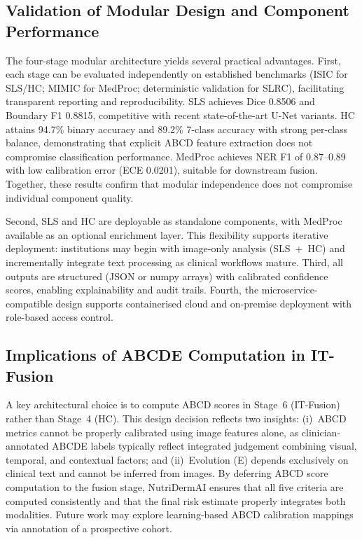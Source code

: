 \documentclass[conference]{IEEEtran}
\begin{document}
\subsection{Validation of Modular Design and Component Performance}

The four-stage modular architecture yields several practical advantages.
First, each stage can be evaluated independently on established
benchmarks (ISIC for SLS/HC; MIMIC for MedProc; deterministic
validation for SLRC), facilitating transparent reporting and
reproducibility. SLS achieves Dice 0.8506 and Boundary F1 0.8815,
competitive with recent state-of-the-art U-Net variants. HC attains
94.7\% binary accuracy and 89.2\% 7-class accuracy with strong
per-class balance, demonstrating that explicit ABCD feature extraction
does not compromise classification performance. MedProc achieves NER F1
of 0.87--0.89 with low calibration error (ECE 0.0201), suitable for
downstream fusion. Together, these results confirm that modular
independence does not compromise individual component quality.

Second, SLS and HC are deployable as standalone components, with MedProc
available as an optional enrichment layer. This flexibility supports
iterative deployment: institutions may begin with image-only analysis
(SLS~+~HC) and incrementally integrate text processing as clinical
workflows mature. Third, all outputs are structured (JSON or numpy
arrays) with calibrated confidence scores, enabling explainability and
audit trails. Fourth, the microservice-compatible design supports
containerised cloud and on-premise deployment with role-based access
control.

\subsection{Implications of ABCDE Computation in IT-Fusion}

A key architectural choice is to compute ABCD scores in Stage~6
(IT-Fusion) rather than Stage~4 (HC). This design decision reflects two
insights: (i)~ABCD metrics cannot be properly calibrated using image
features alone, as clinician-annotated ABCDE labels typically reflect
integrated judgement combining visual, temporal, and contextual factors;
and (ii)~Evolution (E) depends exclusively on clinical text and cannot
be inferred from images. By deferring ABCD score computation to the
fusion stage, NutriDermAI ensures that all five criteria are computed
consistently and that the final risk estimate properly integrates both
modalities. Future work may explore learning-based ABCD calibration
mappings via annotation of a prospective cohort.
\end{document}
